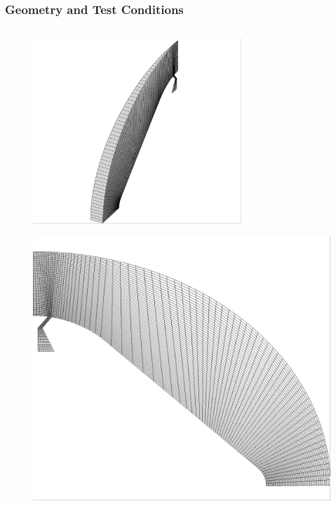 \documentclass{beamer}
\begin{document}
\begin{frame}
  \frametitle{Geometry and Test Conditions}
  \begin{columns}
    \begin{column}{0.4\textwidth}
      \vspace{-0.5cm}
    \begin{figure}
      \centering
      \includegraphics[width=0.7\textwidth]{figures/iso-coarse.png}
    \end{figure}
    \vspace{-0.75cm}
    \begin{figure}
      \centering
        \includegraphics[width=\textwidth]{figures/side-coarse.png}

\end{figure}
\end{column}
\end{columns}
\end{frame}
\end{document}
